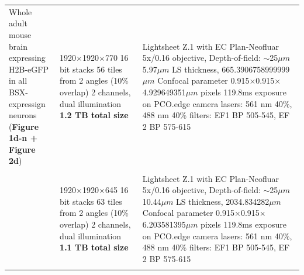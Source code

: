 \documentclass[]{spie}  %
\begin{document}
\begin{landscape}
{\begin{longtable}{lll}
                                         \multirowcell{2}[-4ex][l]{Whole adult mouse brain \\expressing H2B-eGFP in all \\BSX-expressign neurons\\(\textbf{Figure 1d-n + Figure 2d})} &             \makecell[l]{1920$\times$1920$\times$770 16 bit stacks\\56 tiles from 2 angles (10\% overlap) \\2 channels, dual illumination\\\textbf{1.2 TB total size}}  &                                                               \makecell[l]{Lightsheet Z.1 with EC Plan-Neofluar 5x/0.16 objective, Depth-of-field: $\sim$25$\mu{}m$ \\5.97$\mu{}m$ LS thickness, 665.3906758999999$\mu{}m$ Confocal parameter\\0.915$\times$0.915$\times$4.929649351$\mu{}m$ pixels\\119.8ms exposure on PCO.edge camera\\lasers: 561 nm 40\%, 488 nm 40\%\\filters: EF1 BP 505-545, EF 2 BP 575-615} \\ \\
                                                                                                                                   
         &    \makecell[l]{1920$\times$1920$\times$645 16 bit stacks\\63 tiles from 2 angles (10\% overlap) \\2 channels, dual illumination\\\textbf{1.1 TB total size}}  &                                                                    \makecell[l]{Lightsheet Z.1 with EC Plan-Neofluar 5x/0.16 objective, Depth-of-field: $\sim$25$\mu{}m$ \\10.44$\mu{}m$ LS thickness, 2034.834282$\mu{}m$ Confocal parameter\\0.915$\times$0.915$\times$6.203581395$\mu{}m$ pixels\\119.8ms exposure on PCO.edge camera\\lasers: 561 nm 40\%, 488 nm 40\%\\filters: EF1 BP 505-545, EF 2 BP 575-615} \\ \\


\end{longtable}}
\end{landscape}
\end{document}
